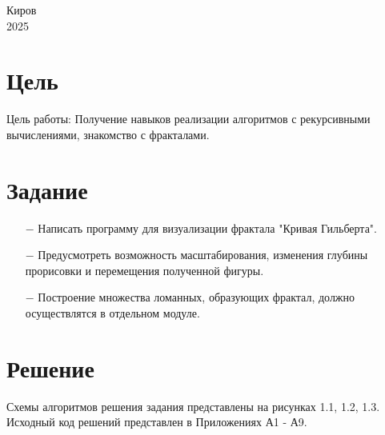 \documentclass[oneside,a4paper,14pt]{extarticle}
\begin{document}
\begin{center}
	Киров\\
	2025
\end{center}

\newpage\thispagestyle{plain}

\section*{Цель}

Цель работы: Получение навыков реализации алгоритмов с рекурсивными вычислениями, знакомство с фракталами.

\section*{Задание}
\begin{itemize}
	\item[$-$] Написать программу для визуализации фрактала "Кривая Гильберта".
  \item[$-$] Предусмотреть возможность масштабирования, изменения глубины прорисовки и перемещения полученной фигуры.
  \item[$-$] Построение множества ломанных, образующих фрактал, должно осуществлятся в отдельном модуле.
\end{itemize}

\section*{Решение}

Схемы алгоритмов решения задания представлены на рисунках 1.1, 1.2, 1.3. Исходный код решений представлен в Приложениях А1 - А9.
\end{document}
